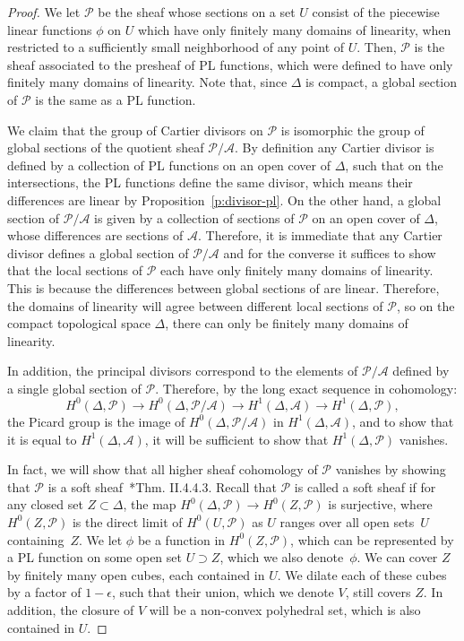 \documentclass[11pt,reqno]{amsart}
\theoremstyle{definition}
\newcommand{\cA}{\mathcal A}
\newcommand{\cP}{\mathcal P}
\begin{document}
\begin{proof}
We let $\cP$ be the sheaf whose sections on a set $U$ consist of the piecewise
linear functions $\phi$ on $U$ which have only finitely many domains of
linearity, when restricted to a sufficiently small neighborhood of any point of
$U$. Then, $\cP$ is the sheaf associated to the presheaf of PL functions, which
were defined to have only finitely many domains of linearity. Note that, since
$\Delta$ is compact, a global section of $\cP$ is the same as a PL function.

We claim that the group of Cartier divisors on $\cP$ is isomorphic the group of
global sections of the quotient sheaf $\cP/\cA$. By definition any Cartier
divisor is defined by a collection of PL functions on an open cover of $\Delta$,
such that on the intersections, the PL functions define the same divisor, which
means their differences are linear by Proposition~\ref{p:divisor-pl}. On the
other hand, a global section of $\cP/\cA$ is given by a collection of sections
of $\cP$ on an open cover of $\Delta$, whose differences are sections of
$\cA$. Therefore, it is immediate that any Cartier divisor defines a global
section of $\cP/\cA$ and for the converse it suffices to show that the local
sections of $\cP$ each have only finitely many domains of linearity. This is
because the differences between global sections of are linear. Therefore, the
domains of linearity will agree between different local sections of $\cP$, so on the
compact topological space $\Delta$, there can only be finitely many domains of
linearity.

In addition, the principal divisors correspond to the elements of $\cP/\cA$
defined by a single global section of $\cP$.
Therefore, by the
long exact sequence in cohomology:
\begin{equation*}
H^0(\Delta, \cP) \rightarrow H^0(\Delta, \cP/\cA) \rightarrow H^1(\Delta, \cA)
\rightarrow H^1(\Delta, \cP),
\end{equation*}
the Picard group is the image of $H^0(\Delta, \cP/\cA)$ in $H^1(\Delta, \cA)$,
and to show that it is equal to $H^1(\Delta, \cA)$,
it will be sufficient to show that $H^1(\Delta, \cP)$ vanishes.

In fact, we will show that all higher sheaf cohomology of $\cP$ vanishes by
showing that $\cP$ is a soft sheaf~\cite{godement}*{Thm. II.4.4.3}. Recall that
$\cP$ is called a soft sheaf if for any closed set $Z \subset \Delta$, the map
$H^0(\Delta, \cP) \rightarrow H^0(Z, \cP)$ is surjective, where $H^0(Z, \cP)$ is
the direct limit of $H^0(U, \cP)$ as $U$ ranges over all open sets~$U$
containing~$Z$. We let $\phi$ be a function in $H^0(Z, \cP)$, which can be
represented by a PL function on some open set $U \supset Z$, which we also
denote~$\phi$. We can cover $Z$ by finitely many open cubes, each contained in
$U$. We dilate each of these cubes by a factor of $1-\epsilon$, such that their
union, which we denote $V$, still covers $Z$. In addition, the closure of $V$
will be a non-convex polyhedral set, which is also contained in $U$.


\end{proof}
\end{document}
